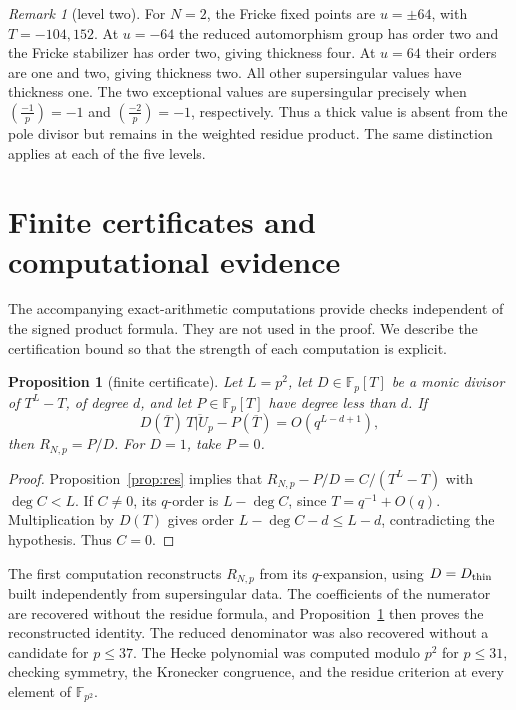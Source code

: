 \documentclass[11pt,a4paper]{article}
\numberwithin{equation}{section}
\newtheorem{proposition}[theorem]{Proposition}
\theoremstyle{definition}
\theoremstyle{remark}
\newtheorem{remark}[theorem]{Remark}
\newcommand{\Fp}{\mathbb F_p}
\newcommand{\Fq}{\mathbb F_{p^2}}
\begin{document}
\begin{remark}[level two]
For $N=2$, the Fricke fixed points are $u=\pm64$, with $T=-104,152$.
At $u=-64$ the reduced automorphism group has order two and the Fricke stabilizer
has order two, giving thickness four. At $u=64$ their orders are one and two,
giving thickness two. All other supersingular values have thickness one.
The two exceptional values are supersingular precisely when
$\left(\frac{-1}{p}\right)=-1$ and $\left(\frac{-2}{p}\right)=-1$, respectively.
Thus a thick value is absent from the pole divisor but remains in the
weighted residue product. The same distinction applies at each of the five levels.
\end{remark}

\section{Finite certificates and computational evidence}\label{sec:comp}
The accompanying exact-arithmetic computations provide checks independent of the
signed product formula. They are not used in the proof. We describe the certification
bound so that the strength of each computation is explicit.

\begin{proposition}[finite certificate]\label{prop:certificate}
Let $L=p^2$, let $D\in\Fp[T]$ be a monic divisor of $T^L-T$, of degree $d$, and
let $P\in\Fp[T]$ have degree less than $d$. If
\[
D(\overline T)\,\overline{T|U_p}-P(\overline T)=O(q^{L-d+1}),
\]
then $R_{N,p}=P/D$. For $D=1$, take $P=0$.
\end{proposition}
\begin{proof}
Proposition~\ref{prop:res} implies that
$R_{N,p}-P/D=C/(T^L-T)$ with $\deg C<L$.
If $C\ne0$, its $q$-order is $L-\deg C$, since $T=q^{-1}+O(q)$.
Multiplication by $D(T)$ gives order $L-\deg C-d\le L-d$, contradicting the
hypothesis. Thus $C=0$.
\end{proof}

The first computation reconstructs $R_{N,p}$ from its $q$-expansion, using
$D=D_{\rm thin}$ built independently from supersingular data.
The coefficients of the numerator are recovered without the residue formula,
and Proposition~\ref{prop:certificate} then proves the reconstructed identity.
The reduced denominator was also recovered without a candidate for $p\le37$.
The Hecke polynomial was computed modulo $p^2$ for $p\le31$, checking symmetry,
the Kronecker congruence, and the residue criterion at every element of $\Fq$.
\end{document}
